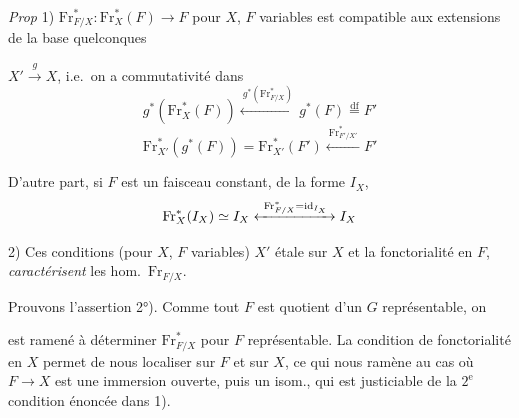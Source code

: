 \documentclass[11pt,a4paper]{article}
\begin{document}
\emph{Prop} 1) $\mathrm{Fr}_{F/X}^{*} : \mathrm{Fr}_X^{*}(F) \longrightarrow F$
pour $X$, $F$ variables est compatible aux
extensions de la base quelconques


$X' \xrightarrow{\ g\ } X$, i.e.\ on a commutativité dans
\[
  g^{*}(\mathrm{Fr}_X^{*}(F)) \xleftarrow{\ g^{*}(\mathrm{Fr}_{F/X}^{*})\ }
  g^{*}(F) \overset{\text{df}}{=} F'
\]
\[
  \mathrm{Fr}_{X'}^{*}(g^{*}(F)) = \mathrm{Fr}_{X'}^{*}(F')
  \xleftarrow{\ \mathrm{Fr}_{F'/X'}^{*}\ } F'
\]


D'autre part, si $F$ est un faisceau constant, de la forme $I_X$, 
\[
  \mathrm{Fr}_X^{*}(I_X) \simeq I_X
  \xleftrightarrow{\ \mathrm{Fr}_{F/X}^{*} = \mathrm{id}_{I_X}\ } I_X
\]

2)   Ces conditions (pour $X$, $F$ variables) \ill{} $X'$ étale sur $X$ \ill{}
et la fonctorialité en $F$, \emph{caractérisent} les hom.\
$\mathrm{Fr}_{F/X}$.


Prouvons l'assertion 2°). Comme tout $F$ \struck{\ill{}} est
quotient d'un $G$ représentable,  on


est ramené à déterminer $\mathrm{Fr}_{F/X}^{*}$ pour $F$ représentable.
La condition de fonctorialité en $X$ \struck{\uncertain{variable}} \add{et
en $F$} permet de nous localiser sur $F$ et sur $X$,
ce qui nous ramène au cas où $F \to X$ est une immersion ouverte,
puis un isom., qui est justiciable de la $2^{\text{e}}$ condition
énoncée dans 1).
\end{document}
